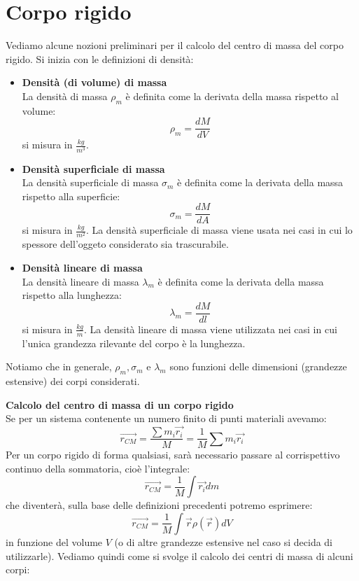 \documentclass[a4paper,12pt]{article}
\begin{document}
\section{Corpo rigido}
Vediamo alcune nozioni preliminari per il calcolo del centro di massa del corpo rigido. Si inizia con le definizioni
di densità:
\begin{itemize}
  \item \textbf{Densità (di volume) di massa} \\
    La densità di massa  $\rho_m$ è definita come la derivata della massa rispetto al volume:
    $$ \rho_m = \frac{dM}{dV}$$
    si misura in $\frac{kg}{m^3}$.
  \item \textbf{Densità superficiale di massa} \\
    La densità superficiale di massa  $\sigma_m$ è definita come la derivata della massa rispetto alla superficie:
    $$ \sigma_m = \frac{dM}{dA}$$
    si misura in $\frac{kg}{m^2}$. La densità superficiale di massa viene usata nei casi in cui lo spessore dell'oggeto considerato
    sia trascurabile.
  \item \textbf{Densità lineare di massa} \\
    La densità lineare di massa  $\lambda_m$ è definita come la derivata della massa rispetto alla lunghezza:
    $$ \lambda_m = \frac{dM}{dl}$$
    si misura in $\frac{kg}{m}$. La densità lineare di massa viene utilizzata nei casi in cui l'unica grandezza rilevante del corpo è la lunghezza.
\end{itemize}
Notiamo che in generale, $\rho_m, \sigma_m$ e $\lambda_m$ sono funzioni delle dimensioni (grandezze estensive) dei corpi considerati.
\par\smallskip
\textbf{Calcolo del centro di massa di un corpo rigido} \\
Se per un sistema contenente un numero finito di punti materiali avevamo:
$$ \vec{r_{CM}} = \frac{\sum m_i\vec{r_i}}{M} = \frac{1}{M} \sum m_i\vec{r_i} $$ 
Per un corpo rigido di forma qualsiasi, sarà necessario passare al corrispettivo continuo della sommatoria, cioè l'integrale:
$$ \vec{r_{CM}} = \frac{1}{M} \int \vec{r_i}dm $$
che diventerà, sulla base delle definizioni precedenti potremo esprimere:
$$ \vec{r_{CM}} = \frac{1}{M} \int \vec{r} \rho(\vec{r})dV $$
in funzione del volume $V$ (o di altre grandezze estensive nel caso si decida di utilizzarle).
Vediamo quindi come si svolge il calcolo dei centri di massa di alcuni corpi:
\end{document}
